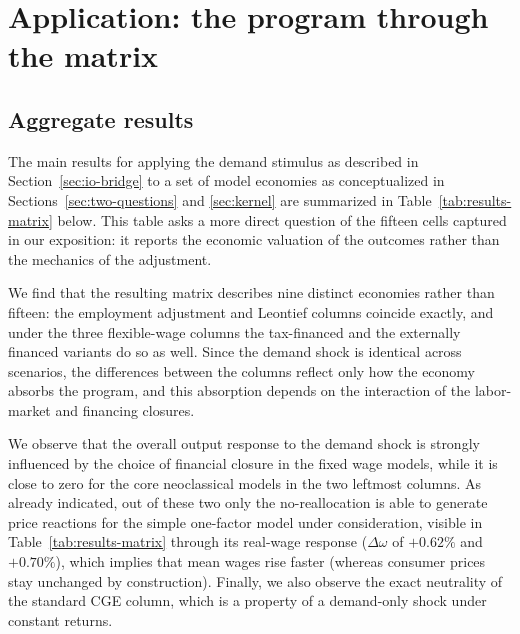 \section{Application: the program through the matrix}\label{sec:application}

\subsection{Aggregate results}\label{subsec:aggregate}

The main results for applying the demand stimulus as described in Section~\ref{sec:io-bridge} to a set of model economies as conceptualized in Sections~\ref{sec:two-questions} and \ref{sec:kernel} are summarized in Table~\ref{tab:results-matrix} below. This table asks a more direct question of the fifteen cells captured in our exposition: it reports the economic valuation of the outcomes rather than the mechanics of the adjustment.

We find that the resulting matrix describes nine distinct economies rather than fifteen: the employment adjustment and Leontief columns coincide exactly, and under the three flexible-wage columns the tax-financed and the externally financed variants do so as well. Since the demand shock is identical across scenarios, the differences between the columns reflect only how the economy absorbs the program, and this absorption depends on the interaction of the labor-market and financing closures.



We observe that the overall output response to the demand shock is strongly influenced by the choice of financial closure in the fixed wage models, while it is close to zero for the core neoclassical models in the two leftmost columns. As already indicated, out of these two only the no-reallocation is able to generate price reactions for the simple one-factor model under consideration, visible in Table~\ref{tab:results-matrix} through its real-wage response ($\Delta\omega$ of $+0.62\%$ and $+0.70\%$), which implies that mean wages rise faster (whereas consumer prices stay unchanged by construction). Finally, we also observe the exact neutrality of the standard CGE column, which is a property of a demand-only shock under constant returns. 


